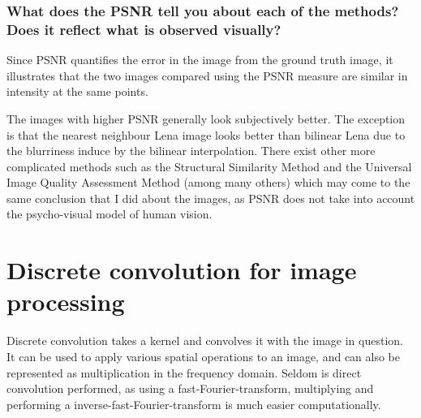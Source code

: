 \documentclass[article, 1.5space, letterpaper, 12pt, oneside, header, footer]{SydeClass}
\begin{document}
\subsubsection{What does the PSNR tell you about each of the methods? Does it reflect what is observed visually?}

Since PSNR quantifies the error in the image from the ground truth image, it illustrates that the two images compared using the PSNR measure are similar in intensity at the same points.

The images with higher PSNR generally look subjectively better. The exception is that the nearest neighbour Lena image looks better than bilinear Lena due to the blurriness induce by the bilinear interpolation. There exist other more complicated methods such as the Structural Similarity Method \cite{ssim-image-qual} and the Universal Image Quality Assessment Method \cite{universal-image-qual} (among many others) which may come to the same conclusion that I did about the images, as PSNR does not take into account the psycho-visual model of human vision.


\clearpage
\section{Discrete convolution for image processing}

Discrete convolution takes a kernel and convolves it with the image in question. It can be used to apply various spatial operations to an image, and can also be represented as multiplication in the frequency domain. Seldom is direct convolution performed, as using a fast-Fourier-transform, multiplying and performing a inverse-fast-Fourier-transform is much easier computationally.
\end{document}

